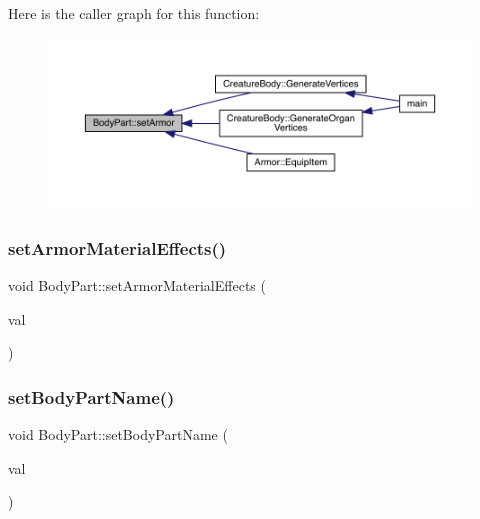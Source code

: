 Here is the caller graph for this function\+:
\nopagebreak
\begin{figure}[H]
\begin{center}
\leavevmode
\includegraphics[width=350pt]{d2/d6f/class_body_part_a089afe1bbd06d3fc84a9870ec173883c_icgraph}
\end{center}
\end{figure}
\mbox{\label{class_body_part_a042e07259ce197a1077fe36660332a33}} 
\subsubsection{\texorpdfstring{set\+Armor\+Material\+Effects()}{setArmorMaterialEffects()}}
{\footnotesize\ttfamily void Body\+Part\+::set\+Armor\+Material\+Effects (\begin{DoxyParamCaption}\item[{\mbox{\hyperlink{struct_applied_force_effect}{Applied\+Force\+Effect}}}]{val }\end{DoxyParamCaption})}

\mbox{\label{class_body_part_a9d3d014b8d645dbbf1ef6c14335ef940}} 
\subsubsection{\texorpdfstring{set\+Body\+Part\+Name()}{setBodyPartName()}}
{\footnotesize\ttfamily void Body\+Part\+::set\+Body\+Part\+Name (\begin{DoxyParamCaption}\item[{std\+::string}]{val }\end{DoxyParamCaption})}

